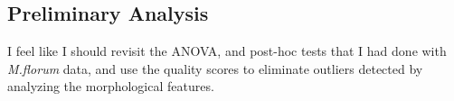 \subsection{Preliminary Analysis}
\begin{tcolorbox}[colback=red!5,colframe=red!40!black,title=Work in progress] %
I feel like I should revisit the ANOVA, and post-hoc tests that I had done with {\emph{M.florum}} data, and use the quality scores to eliminate outliers detected by analyzing the morphological features.
\end{tcolorbox}


